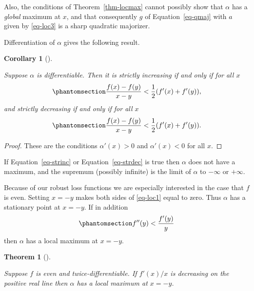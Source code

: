 \documentclass[
  12pt,
  letterpaper,
  DIV=11,
  numbers=noendperiod]{scrartcl}
\theoremstyle{definition}
\theoremstyle{definition}
\theoremstyle{plain}
\newtheorem{corollary}{Corollary}[section]
\theoremstyle{plain}
\newtheorem{theorem}{Theorem}[section]
\theoremstyle{plain}
\theoremstyle{remark}
\begin{document}
Also, the conditions of Theorem~\ref{thm-locmax} cannot possibly show
that \(\alpha\) has a \emph{global} maximum at \(x\), and that
consequently \(g\) of Equation~\ref{eq-qmaj} with \(a\) given by
\eqref{eq-loc3} is a sharp quadratic majorizer.

Differentiation of \(\alpha\) gives the following result.

\begin{corollary}[]\protect\hypertarget{cor-incdec}{}\label{cor-incdec}

Suppose \(\alpha\) is differentiable. Then it is strictly increasing if
and only if for all \(x\)
\begin{equation}\phantomsection\label{eq-strinc}{
\frac{f(x)-f(y)}{x-y}<\frac12(f'(x)+f'(y)),
}\end{equation} and strictly decreasing if and only if for all \(x\)
\begin{equation}\phantomsection\label{eq-strdec}{
\frac{f(x)-f(y)}{x-y}<\frac12(f'(x)+f'(y)).
}\end{equation}

\end{corollary}

\begin{proof}
These are the conditions \(\alpha'(x)>0\) and \(\alpha'(x)<0\) for all
\(x\).
\end{proof}

If Equation~\ref{eq-strinc} or Equation~\ref{eq-strdec} is true then
\(\alpha\) does not have a maximum, and the supremum (possibly infinite)
is the limit of \(\alpha\) to \(-\infty\) or \(+\infty\).

Because of our robust loss functions we are especially interested in the
case that \(f\) is even. Setting \(x=-y\) makes both sides of
\eqref{eq-loc1} equal to zero. Thus \(\alpha\) has a stationary point at
\(x=-y\). If in addition \begin{equation}\phantomsection\label{eq-miny}{
f''(y)<\frac{f'(y)}{y}
}\end{equation} then \(\alpha\) has a local maximum at \(x=-y\).

\begin{theorem}[]\protect\hypertarget{thm-evena}{}\label{thm-evena}

Suppose \(f\) is even and twice-differentiable. If \(f'(x)/x\) is
decreasing on the positive real line then \(\alpha\) has a local maximum
at \(x=-y\).

\end{theorem}
\end{document}
